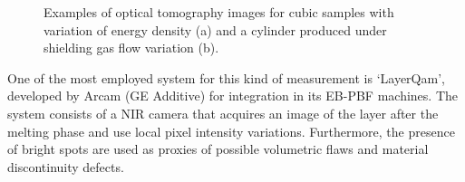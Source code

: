 \begin{figure}
    \centering
    \qquad
    \caption[optical tomography examples.]{Examples of optical tomography images for cubic samples with variation of energy density (a) and a cylinder produced under shielding gas flow variation (b)\cite{bamberg_-process_2016}.}
\end{figure}
One of the most employed system for this kind of measurement is ‘LayerQam’, developed by Arcam (GE Additive) for integration in its EB-PBF machines. The system consists of a NIR camera that acquires an image of the layer after the melting phase and use local pixel intensity variations. Furthermore, the presence of bright spots are used as proxies of possible volumetric flaws and material discontinuity defects.

